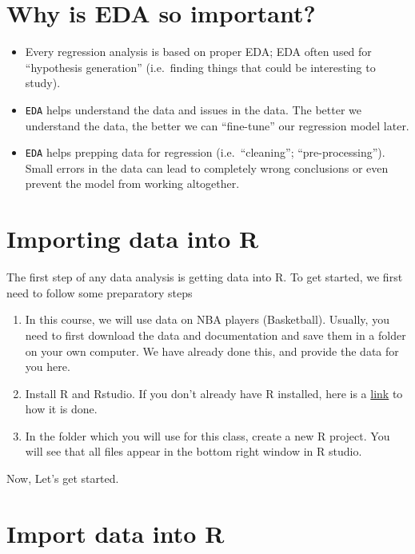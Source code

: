 \documentclass[
]{book}
\providecommand{\tightlist}{%
  \setlength{\itemsep}{0pt}\setlength{\parskip}{0pt}}
\begin{document}
\hypertarget{why-is-eda-so-important}{%
\section{Why is EDA so important?}\label{why-is-eda-so-important}}

\begin{itemize}
\tightlist
\item
  Every regression analysis is based on proper EDA; EDA often used for ``hypothesis generation'' (i.e.~finding things that could be interesting to study).
\item
  \texttt{EDA} helps understand the data and issues in the data. The better we understand the data, the better we can ``fine-tune'' our regression model later.
\item
  \texttt{EDA} helps prepping data for regression (i.e.~``cleaning''; ``pre-processing''). Small errors in the data can lead to completely wrong conclusions or even prevent
  the model from working altogether.
\end{itemize}

\hypertarget{importing-data-into-r}{%
\section{Importing data into R}\label{importing-data-into-r}}

The first step of any data analysis is getting data into R. To get started, we first need to follow some preparatory steps

\begin{enumerate}
\def\labelenumi{\arabic{enumi}.}
\item
  In this course, we will use data on NBA players (Basketball). Usually, you need to first download the data and documentation and save them in a folder on your own computer. We have already done this, and provide the data for you here.
\item
  Install R and Rstudio. If you don't already have R installed, here is a \href{https://rstudio-education.github.io/hopr/starting.html\#rstudio}{link} to how it is done.
\item
  In the folder which you will use for this class, create a new R project. You will see that all files appear in the bottom right window in R studio.
\end{enumerate}

Now, Let's get started.

\hypertarget{import-data-into-r}{%
\section{Import data into R}\label{import-data-into-r}}
\end{document}
